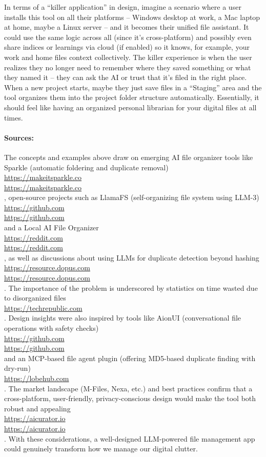 \documentclass[11pt]{article}
\begin{document}
In terms of a “killer application” in design, imagine a scenario where a user installs this tool on all their platforms -- Windows desktop at work, a Mac laptop at home, maybe a Linux server -- and it becomes their unified file assistant. It could use the same logic across all (since it’s cross-platform) and possibly even share indices or learnings via cloud (if enabled) so it knows, for example, your work and home files context collectively. The killer experience is when the user realizes they no longer need to remember where they saved something or what they named it -- they can ask the AI or trust that it’s filed in the right place. When a new project starts, maybe they just save files in a “Staging” area and the tool organizes them into the project folder structure automatically. Essentially, it should feel like having an organized personal librarian for your digital files at all times.

\paragraph{Sources:} The concepts and examples above draw on emerging AI file organizer tools like Sparkle (automatic foldering and duplicate removal) \\ \url{https://makeitsparkle.co} \\ \url{https://makeitsparkle.co} \\ , open-source projects such as LlamaFS (self-organizing file system using LLM-3) \\ \url{https://github.com} \\ \url{https://github.com} \\ and a Local AI File Organizer \\ \url{https://reddit.com} \\ \url{https://reddit.com} \\ , as well as discussions about using LLMs for duplicate detection beyond hashing \\ \url{https://resource.dopus.com} \\ \url{https://resource.dopus.com} \\ . The importance of the problem is underscored by statistics on time wasted due to disorganized files \\ \url{https://techrepublic.com} \\ . Design insights were also inspired by tools like AionUI (conversational file operations with safety checks) \\ \url{https://github.com} \\ \url{https://github.com} \\ and an MCP-based file agent plugin (offering MD5-based duplicate finding with dry-run) \\ \url{https://lobehub.com} \\ . The market landscape (M-Files, Nexa, etc.) and best practices confirm that a cross-platform, user-friendly, privacy-conscious design would make the tool both robust and appealing \\ \url{https://aicurator.io} \\ \url{https://aicurator.io} \\ . With these considerations, a well-designed LLM-powered file management app could genuinely transform how we manage our digital clutter.
\end{document}
